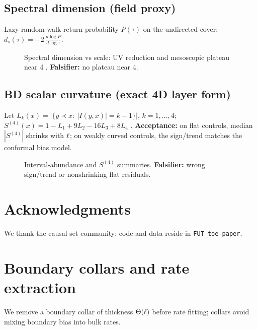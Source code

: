 \subsection{Spectral dimension (field proxy)}
Lazy random-walk return probability $P(\tau)$ on the undirected cover: $d_s(\tau)=-2\,\frac{d\log P}{d\log \tau}$.
\begin{figure}[H]\centering
{}
\caption{Spectral dimension vs scale: UV reduction and mesoscopic plateau near 4 \citep{Glaser2011DICE,Meyer1988}. \textbf{Falsifier:} no plateau near $4$.}
\end{figure}

\subsection{BD scalar curvature (exact 4D layer form)}
Let $L_k(x)=|\{y\prec x:\ |I(y,x)|=k-1\}|$, $k=1,\dots,4$; $S^{(4)}(x)=1-L_1+9L_2-16L_3+8L_4$ \citep{BenincasaDowker2010}. \textbf{Acceptance:} on flat controls, median $|S^{(4)}|$ shrinks with $\ell$; on weakly curved controls, the sign/trend matches the conformal bias model.
\begin{figure}[H]\centering
{}
\caption{Interval-abundance and $S^{(4)}$ summaries. \textbf{Falsifier:} wrong sign/trend or nonshrinking flat residuals.}
\end{figure}

\section*{Acknowledgments}
We thank the causal set community; code and data reside in \texttt{FUT\_toe-paper}.

\appendix

\section{Boundary collars and rate extraction}
We remove a boundary collar of thickness $\Theta(\ell)$ before rate fitting; collars avoid mixing boundary bias into bulk rates.

\nocite{AslanbeigiEtAl2014,BenincasaDowker2010,Glaser2011DICE,Meyer1988}

\FloatBarrier
\clearpage




